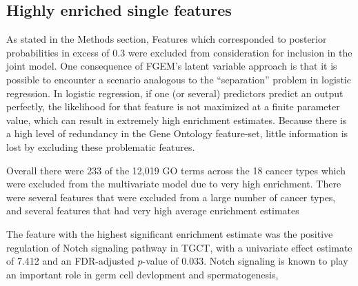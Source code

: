 \subsection{Highly enriched single features}\label{sec:org530c0fc}

As stated in the Methods section, Features which corresponded to posterior probabilities in excess of 0.3 were excluded from consideration for inclusion in the joint model.  One consequence of FGEM's latent variable approach
is that it is possible to encounter a scenario analogous to the ``separation'' problem in logistic regression.  In logistic regression, if one (or several) predictors predict an output perfectly, the likelihood for that 
feature is not maximized at a finite parameter value, which can result in extremely high enrichment estimates.  Because there is a high level of redundancy in the Gene Ontology feature-set, little information is lost by excluding these problematic features.  

Overall there were 233 of the 12,019 GO terms across the 18 cancer types which were excluded from the multivariate model due to very high enrichment.  There were several features that were excluded from a large number of cancer types, and several features that had very high average enrichment estimates

The feature with the highest significant enrichment estimate was the positive regulation of Notch signaling pathway in TGCT, with a univariate effect estimate of 7.412 and an FDR-adjusted $p$-value of 0.033.  Notch signaling is known to play an important role in germ cell devlopment and spermatogenesis\cite{Huang_2013}, 

